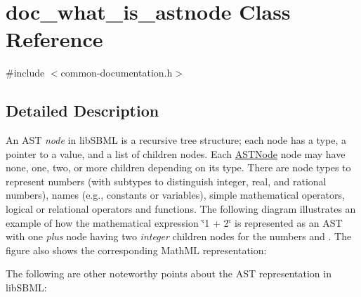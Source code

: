 \hypertarget{classdoc__what__is__astnode}{}\section{doc\+\_\+what\+\_\+is\+\_\+astnode Class Reference}
\label{classdoc__what__is__astnode}


{\ttfamily \#include $<$common-\/documentation.\+h$>$}



\subsection{Detailed Description}
\begin{DoxyParagraph}{}
An A\+ST {\itshape node} in lib\+S\+B\+ML is a recursive tree structure; each node has a type, a pointer to a value, and a list of children nodes. Each \hyperlink{class_a_s_t_node}{A\+S\+T\+Node} node may have none, one, two, or more children depending on its type. There are node types to represent numbers (with subtypes to distinguish integer, real, and rational numbers), names (e.\+g., constants or variables), simple mathematical operators, logical or relational operators and functions. The following diagram illustrates an example of how the mathematical expression {\ttfamily \char`\"{}1 + 2\char`\"{}} is represented as an A\+ST with one {\itshape plus} node having two {\itshape integer} children nodes for the numbers {} and {}. The figure also shows the corresponding Math\+ML representation\+:
\end{DoxyParagraph}


The following are other noteworthy points about the A\+ST representation in lib\+S\+B\+ML\+:

